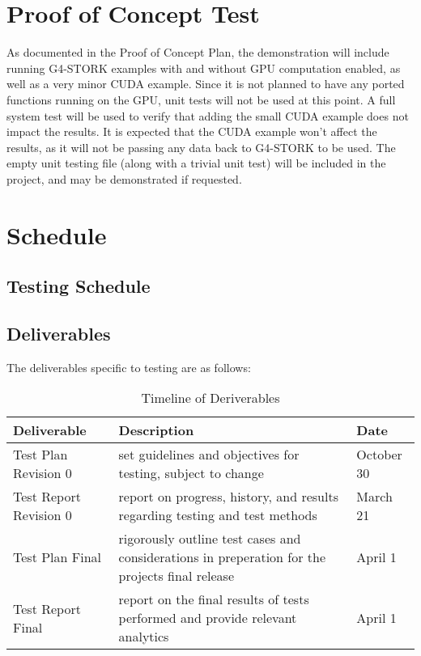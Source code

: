 \documentclass[12pt]{article}
\begin{document}
\section{Proof of Concept Test}
As documented in the Proof of Concept Plan, the demonstration will include running G4-STORK examples with and without GPU computation enabled, as well as a very minor CUDA example. Since it is not planned to have any ported functions running on the GPU, unit tests will not be used at this point. A full system test will be used to verify that adding the small CUDA example does not impact the results. It is expected that the CUDA example won't affect the results, as it will not be passing any data back to G4-STORK to be used. The empty unit testing file (along with a trivial unit test) will be included in the project, and may be demonstrated if requested.

\section{Schedule}

\subsection{Testing Schedule} %
\newpage
\subsection{Deliverables} %
The deliverables specific to testing are as follows:
\begin{centering}
\begin{longtable}{>{\raggedright\arraybackslash}p{}>{\raggedright\arraybackslash}p{}>{\raggedright\arraybackslash}p{}}
\caption{Timeline of Deriverables}\\\toprule
\bf Deliverable & \bf Description & \bf Date\\\toprule

Test Plan Revision 0 & set guidelines and objectives for testing, subject to change & October 30\\\midrule
Test Report Revision 0 & report on progress, history, and results regarding testing and test methods & March 21\\\midrule
Test Plan Final & rigorously outline test cases and considerations in preperation for the projects final release & April 1\\\midrule
Test Report Final & report on the final results of tests performed and provide relevant analytics & April 1\\\bottomrule
\end{longtable}
\end{centering}
\end{document}
